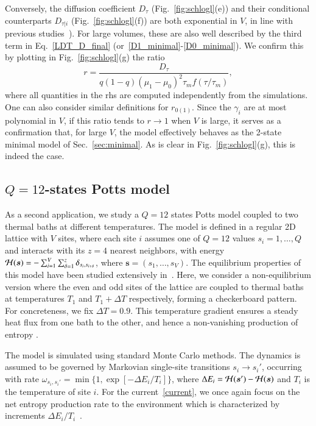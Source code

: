 \documentclass[aps,pre,reprint, amsmath, amssymb,superscriptaddress]{revtex4-1}
\begin{document}
Conversely, the diffusion coefficient $D_\tau$ (Fig.~\ref{fig:schlogl}(e)) and their conditional counterparts $D_{\tau|i}$ (Fig.~\ref{fig:schlogl}(f)) are both exponential in $V$, in line with previous studies~\cite{Nguyen2020}). 
For large volumes, these are also well described by the 
third term in Eq.~\eqref{LDT_D_final} (or~\eqref{D1_minimal}-\eqref{D0_minimal}).
We confirm this by plotting in Fig.~\ref{fig:schlogl}(g) the ratio 
\begin{equation}\label{ratio}
r = \frac{D_\tau}{q(1-q) (\mu_1-\mu_0)^2 \tau_m f(\tau/\tau_m)}, 
\end{equation}
where all quantities in the rhs are computed independently from the simulations. 
One can also consider similar definitions for $r_{0(1)}$. 
Since the $\gamma_i$ are at most polynomial in $V$, if this ratio tends to $r\to 1$ when $V$ is large, it serves as a confirmation that, for large $V$, the model effectively behaves as the 2-state minimal model of Sec.~\ref{sec:minimal}.
As is clear in Fig.~\ref{fig:schlogl}(g), this is indeed the case. 




%
%
\subsection{$Q=12$-states Potts model}


As a second application, we study a $Q=12$ states Potts model coupled to two thermal baths at different temperatures.  
The model is defined in a regular 2D lattice with $V$ sites, where each site  $i$ assumes  one of $Q=12$ values $s_i = 1,\ldots,Q$ and interacts with its $z=4$ nearest neighbors, with energy 
${\cal H}(\bm{s})=-\sum_{i=1}^V\sum_{\delta=1}^z\delta_{s_i,s_{i+\delta}}$, 
where $\bm{s} = (s_1,\ldots,s_V)$. 
The equilibrium properties of this model have been studied extensively in~\cite{potts,kim19811,baxter1982magnetisation,fiorejcp2013,PhysRevLett.107.230601}. 
Here, we consider a non-equilibrium version where   the even and odd sites of the lattice are coupled  to thermal baths at temperatures $T_1$ and $T_1+\Delta T$ respectively, forming a checkerboard pattern. 
For concreteness, we fix $\Delta T = 0.9$.
This temperature gradient ensures a steady heat flux from one bath to the other, and hence a non-vanishing production of entropy \cite{Tome2012,Martynec_2020}. 

The model is simulated using standard Monte Carlo methods. 
The dynamics is assumed to be governed by Markovian single-site transitions  $s_i \to s_i'$, occurring with
rate  
$\omega_{s_i,s_i'}=\min\{1,\exp[-\Delta E_i/T_i]\}$,
where $\Delta E_i={\cal H}(\bm{s}')-{\cal H}(\bm{s})$
and $T_i$ is the temperature of site $i$.
For the current~\eqref{current}, we once again focus on the net entropy production rate to the environment which is characterized by increments $\Delta E_i/T_i$~\cite{Zhang2016,Martynec_2020}. 
\end{document}
